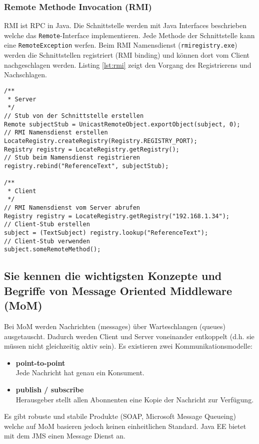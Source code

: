 \subsubsection{Remote Methode Invocation (RMI)}

RMI ist RPC in Java. Die Schnittstelle werden mit Java Interfaces beschrieben welche das \texttt{Remote}-Interface implementieren. Jede Methode der Schnittstelle kann eine \texttt{RemoteException} werfen. Beim RMI Namensdienst (\texttt{rmiregistry.exe}) werden die Schnittstellen registriert (RMI binding) und können dort vom Client nachgeschlagen werden. Listing \ref{lst:rmi} zeigt den Vorgang des Registrierens und Nachschlagen.

\begin{lstlisting}[caption={RMI Binding},label=lst:rmi]
/**
 * Server
 */
// Stub von der Schnittstelle erstellen
Remote subjectStub = UnicastRemoteObject.exportObject(subject, 0);
// RMI Namensdienst erstellen
LocateRegistry.createRegistry(Registry.REGISTRY_PORT);
Registry registry = LocateRegistry.getRegistry();
// Stub beim Namensdienst registrieren
registry.rebind("ReferenceText", subjectStub);

/**
 * Client
 */
// RMI Namensdienst vom Server abrufen
Registry registry = LocateRegistry.getRegistry("192.168.1.34");
// Client-Stub erstellen
subject = (TextSubject) registry.lookup("ReferenceText");
// Client-Stub verwenden
subject.someRemoteMethod();
\end{lstlisting}

\subsection{Sie kennen die wichtigsten Konzepte und Begriffe von Message Oriented Middleware (MoM)}

Bei \ac{MoM} werden Nachrichten (messages) über Warteschlangen (queues) ausgetauscht. Dadurch werden Client und Server voneinander entkoppelt (d.h. sie müssen nicht gleichzeitig aktiv sein). Es existieren zwei Kommunikationsmodelle:
\begin{itemize}
	\item \textbf{point-to-point} \\
		  Jede Nachricht hat genau ein Konsument.
		  
	\item \textbf{publish / subscribe} \\
		  Herausgeber stellt allen Abonnenten eine Kopie der Nachricht zur Verfügung.
\end{itemize}
Es gibt robuste und stabile Produkte (SOAP, Microsoft Message Queueing) welche auf \ac{MoM} basieren jedoch keinen einheitlichen Standard. Java EE bietet mit dem \ac{JMS} einen Message Dienst an.

